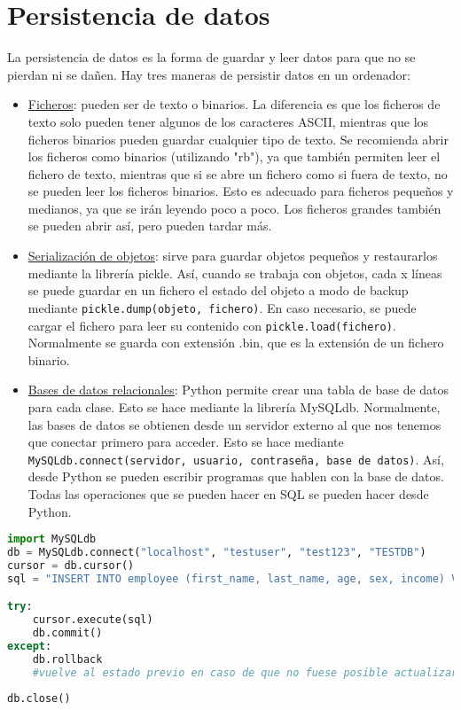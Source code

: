 \section{Persistencia de datos}
La persistencia de datos es la forma de guardar y leer datos para que no se pierdan ni se dañen. Hay tres maneras de persistir datos en un ordenador: 
\begin{itemize}
\item \underline{Ficheros}: pueden ser de texto o binarios. La diferencia es que los ficheros de texto solo pueden tener algunos de los caracteres ASCII, mientras que los ficheros binarios pueden guardar cualquier tipo de texto. Se recomienda abrir los ficheros como binarios (utilizando "rb"), ya que también permiten leer el fichero de texto, mientras que si se abre un fichero como si fuera de texto, no se pueden leer los ficheros binarios. Esto es adecuado para ficheros pequeños y medianos, ya que se irán leyendo poco a poco. Los ficheros grandes también se pueden abrir así, pero pueden tardar más.
\item \underline{Serialización de objetos}: sirve para guardar objetos pequeños y restaurarlos mediante la librería pickle. Así, cuando se trabaja con objetos, cada x líneas se puede guardar en un fichero el estado del objeto a modo de backup mediante \texttt{pickle.dump(objeto, fichero)}. En caso necesario, se puede cargar el fichero para leer su contenido con \texttt{pickle.load(fichero)}. Normalmente se guarda con extensión .bin, que es la extensión de un fichero binario.
\item \underline{Bases de datos relacionales}: Python permite crear una tabla de base de datos para cada clase. Esto se hace mediante la librería MySQLdb. Normalmente, las bases de datos se obtienen desde un servidor externo al que nos tenemos que conectar primero para acceder. Esto se hace mediante \texttt{MySQLdb.connect(servidor, usuario, contraseña, base de datos)}. Así, desde Python se pueden escribir programas que hablen con la base de datos. Todas las operaciones que se pueden hacer en SQL se pueden hacer desde Python.
\end{itemize}
\begin{lstlisting}[language=Python]
import MySQLdb
db = MySQLdb.connect("localhost", "testuser", "test123", "TESTDB")
cursor = db.cursor()
sql = "INSERT INTO employee (first_name, last_name, age, sex, income) VALUES ('%s', '%s', '%d', '%c', '%d')" % ('Marc', 'Mohan', 20, 'M', 2000)

try:
	cursor.execute(sql)
	db.commit()
except:
	db.rollback 
	#vuelve al estado previo en caso de que no fuese posible actualizar todos los datos a la base de datos por una caída o así
	
db.close()
\end{lstlisting}